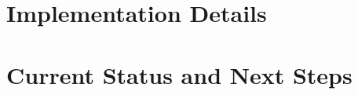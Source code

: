 \documentclass[11pt,a4paper]{article}
\begin{document}









\section{Implementation Details}
\label{sec:implementation}











\section{Current Status and Next Steps}
\label{sec:status}











\end{document}
